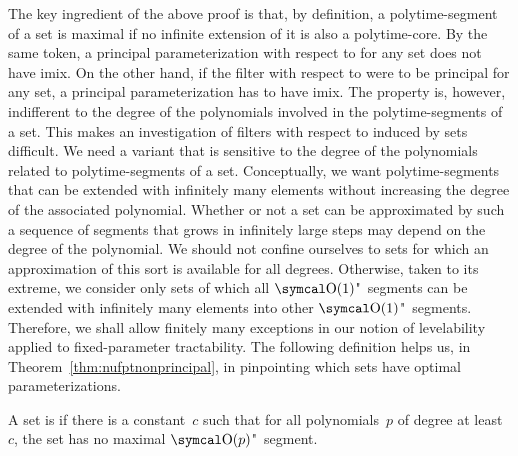 The key ingredient of the above proof is that, by definition, a polytime-segment of a set is maximal if no infinite extension of it is also a polytime-core.
By the same token, a principal parameterization with respect to  for any  set does not have imix.
On the other hand, if the filter with respect to  were to be principal for any  set, a principal parameterization has to have imix.
The  property is, however, indifferent to the degree of the polynomials involved in the polytime-segments of a set.
This makes an investigation of filters with respect to  induced by  sets difficult.
We need a variant that is sensitive to the degree of the polynomials related to polytime-segments of a set.
Conceptually, we want polytime-segments that can be extended with infinitely many elements without increasing the degree of the associated polynomial.
Whether or not a set can be approximated by such a sequence of segments that grows in infinitely large steps may depend on the degree of the polynomial.
We should not confine ourselves to sets for which an approximation of this sort is available for all degrees.
Otherwise, taken to its extreme, we consider only sets of which all $\bigO(1)$"~segments can be extended with infinitely many elements into other $\bigO(1)$"~segments.
Therefore, we shall allow finitely many exceptions in our notion of levelability applied to fixed-parameter tractability.
The following definition helps us, in Theorem~\ref{thm:nufptnonprincipal}, in pinpointing which sets have optimal parameterizations.
\begin{definition}
\label{def:fpt-levelable}%
  A set is  if there is a constant~$c$ such that for all polynomials~$p$ of degree at least $c$, the set has no maximal $\bigO(p)$"~segment.
\end{definition}

